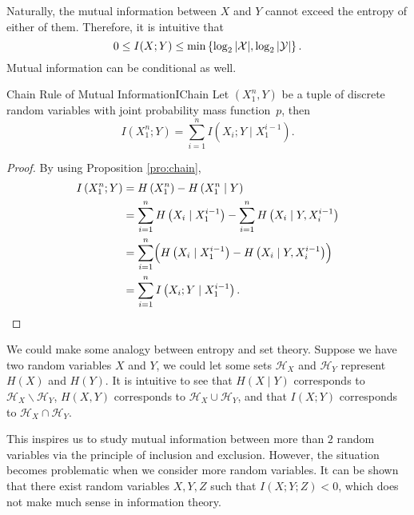 \documentclass[math, code]{amznotes}
\theoremstyle{remark}
\begin{document}
Naturally, the mutual information between $X$ and $Y$ cannot exceed the entropy of either of them. Therefore, it is intuitive that 
\begin{equation*}
    0 \leq I(X ; Y) \leq \min\left\{\log_2{\left\lvert {\mathcal{X}} \right\rvert}, \log_2{\left\lvert {\mathcal{Y}} \right\rvert}\right\}.
\end{equation*}
Mutual information can be conditional as well.
\begin{probox}{Chain Rule of Mutual Information}{IChain}
    Let $\left(X_1^n, Y\right)$ be a tuple of discrete random variables with joint probability mass function~$p$, then 
    \begin{equation*}
        I\left(X_1^n ; Y\right) = \sum_{i = 1}^{n}I\left(X_i ; Y \mid X_1^{i - 1}\right).
    \end{equation*}
    \tcblower
    \begin{proof}
        By using Proposition \ref{pro:chain},
        \begin{align*}
            I\left(X_1^n ; Y\right) & = H\left(X_1^n\right) - H\left(X_1^n \mid Y\right) \\
            & = \sum_{i = 1}^{n}H\left(X_i \mid X_1^{i - 1}\right) - \sum_{i = 1}^{n}H\left(X_i \mid Y, X_i^{i - 1}\right) \\
            & = \sum_{i = 1}^{n}\Bigl(H\left(X_i \mid X_1^{i - 1}\right) - H\left(X_i \mid Y, X_i^{i - 1}\right)\Bigr) \\
            & = \sum_{i = 1}^{n}I\left(X_i ; Y \mid X_1^{i - 1}\right).
        \end{align*}
    \end{proof}
\end{probox}
We could make some analogy between entropy and set theory. Suppose we have two random variables $X$ and $Y$, we could let some sets $\mathcal{H}_X$ and $\mathcal{H}_Y$ represent $H\left(X\right)$ and $H\left(Y\right)$. It is intuitive to see that $H\left(X \mid Y\right)$ corresponds to $\mathcal{H}_X \backslash \mathcal{H}_Y$, $H\left(X, Y\right)$ corresponds to $\mathcal{H}_X \cup \mathcal{H}_Y$, and that $I\left(X ; Y\right)$ corresponds to $\mathcal{H}_X \cap \mathcal{H}_Y$.

This inspires us to study mutual information between more than $2$ random variables via the principle of inclusion and exclusion. However, the situation becomes problematic when we consider more random variables. It can be shown that there exist random variables $X, Y, Z$ such that $I\left(X ; Y ; Z\right) < 0$, which does not make much sense in information theory.
\end{document}
